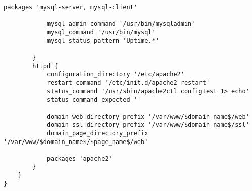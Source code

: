 \begin{multicols}{2}
\begin{lstlisting}[style=Java, caption=Beispiel Profil Ubuntu Server]
			packages 'mysql-server, mysql-client'
			
			mysql_admin_command '/usr/bin/mysqladmin'
			mysql_command '/usr/bin/mysql'
			mysql_status_pattern 'Uptime.*'
			
		}
		httpd {
			configuration_directory '/etc/apache2'
			restart_command '/etc/init.d/apache2 restart'
			status_command '/usr/sbin/apache2ctl configtest 1> echo'
			status_command_expected ''
			
			domain_web_directory_prefix '/var/www/$domain_name$/web'
			domain_ssl_directory_prefix '/var/www/$domain_name$/ssl'
			domain_page_directory_prefix '/var/www/$domain_name$/$page_name$/web'
			
			packages 'apache2'
		}
	}
}
\end{lstlisting}

\end{multicols}

